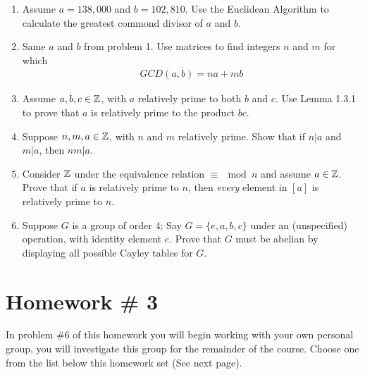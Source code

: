 \begin{enumerate}
    \item Assume $a=138,000$ and $b=102,810$. Use the Euclidean Algorithm to calculate the greatest commond divisor of $a$ and $b$. \\ \steezybreak
    
    \item Same $a$ and $b$ from problem 1. Use matrices to find integers $n$ and $m$ for which
    \begin{align}
        GCD(a,b)=na+mb \nonumber
    \end{align}
    \item Assume $a,b,c\in {\mathbb{ Z}}$, with $a$ relatively prime to both $b$ and $c$. Use Lemma 1.3.1 to prove that $a$ is relatively prime to the product $bc$. \\ \steezybreak

    \item Suppose $n,m,a \in {\mathbb{ Z}}$, with $n$ and $m$ relatively prime. Show that if $n|a$ and $m|a$, then $nm|a$. \\ \steezybreak
    
    \item Consider ${\mathbb{ Z}}$ under the equivalence relation $\equiv \mod n$ and assume $a\in {\mathbb{ Z}}$. Prove that if $a$ is relatively prime to $n$, then \textit{every} element in $[a]$ is relatively prime to $n$. \\ \steezybreak
    
    \item Suppose $G$ is a group of order $4$; Say $G=\{e,a,b,c\}$ under an (unspecified) operation, with identity element $e$. Prove that $G$ must be abelian by displaying all possible Cayley tables for $G$.
\end{enumerate}
\newpage

\section{Homework \# 3}
\label{sec:HW3}

In problem \#6 of this homework you will begin working with your own personal group, you will investigate this group for the remainder of the course. Choose one from the list below this homework set (See next page). \\ \steezybreak

